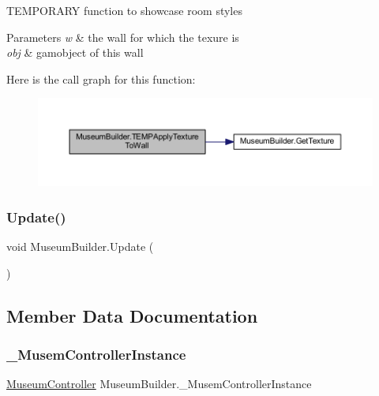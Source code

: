 T\+E\+M\+P\+O\+R\+A\+RY function to showcase room styles 


\begin{DoxyParams}{Parameters}
{\em w} & the wall for which the texure is\\
\hline
{\em obj} & gamobject of this wall\\
\hline
\end{DoxyParams}
Here is the call graph for this function\+:
\nopagebreak
\begin{figure}[H]
\begin{center}
\leavevmode
\includegraphics[width=350pt]{class_museum_builder_a892b18a8420e1e96ce712f65bc309068_cgraph}
\end{center}
\end{figure}
\mbox{\label{class_museum_builder_a6f66f859260dac43de5248e3c4a0b25c}} 
\subsubsection{\texorpdfstring{Update()}{Update()}}
{\footnotesize\ttfamily void Museum\+Builder.\+Update (\begin{DoxyParamCaption}{ }\end{DoxyParamCaption})\hspace{0.3cm}{\ttfamily [private]}}



\subsection{Member Data Documentation}
\mbox{\label{class_museum_builder_ab63ff4582a395d2172a05542dbca8341}} 
\subsubsection{\texorpdfstring{\+\_\+\+Musem\+Controller\+Instance}{\_MusemControllerInstance}}
{\footnotesize\ttfamily \mbox{\hyperlink{class_museum_controller}{Museum\+Controller}} Museum\+Builder.\+\_\+\+Musem\+Controller\+Instance\hspace{0.3cm}{\ttfamily [private]}}



